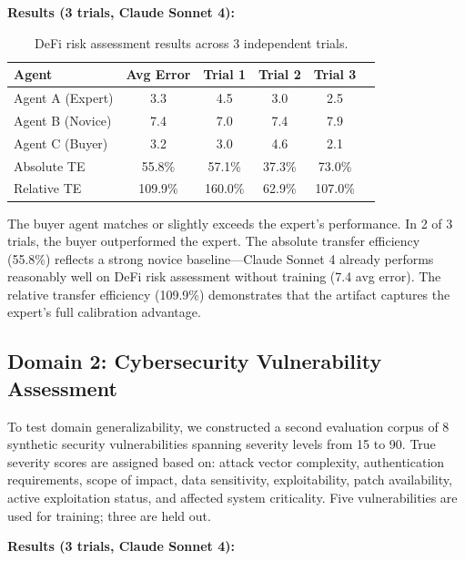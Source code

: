 \documentclass[11pt]{article}
\begin{document}
\textbf{Results (3 trials, Claude Sonnet 4):}

\begin{table}[h]
\centering
\caption{DeFi risk assessment results across 3 independent trials.}
\label{tab:defi_results}
\begin{tabular}{lccccc}
\toprule
\textbf{Agent} & \textbf{Avg Error} & \textbf{Trial 1} & \textbf{Trial 2} & \textbf{Trial 3} \\
\midrule
Agent A (Expert) & 3.3 & 4.5 & 3.0 & 2.5 \\
Agent B (Novice) & 7.4 & 7.0 & 7.4 & 7.9 \\
Agent C (Buyer)  & 3.2 & 3.0 & 4.6 & 2.1 \\
\midrule
Absolute TE      & 55.8\% & 57.1\% & 37.3\% & 73.0\% \\
Relative TE      & 109.9\% & 160.0\% & 62.9\% & 107.0\% \\
\bottomrule
\end{tabular}
\end{table}

The buyer agent matches or slightly exceeds the expert's performance. In 2 of 3 trials, the buyer outperformed the expert. The absolute transfer efficiency (55.8\%) reflects a strong novice baseline---Claude Sonnet 4 already performs reasonably well on DeFi risk assessment without training (7.4 avg error). The relative transfer efficiency (109.9\%) demonstrates that the artifact captures the expert's full calibration advantage.

\subsection{Domain 2: Cybersecurity Vulnerability Assessment}

To test domain generalizability, we constructed a second evaluation corpus of 8 synthetic security vulnerabilities spanning severity levels from 15 to 90. True severity scores are assigned based on: attack vector complexity, authentication requirements, scope of impact, data sensitivity, exploitability, patch availability, active exploitation status, and affected system criticality. Five vulnerabilities are used for training; three are held out.

\textbf{Results (3 trials, Claude Sonnet 4):}
\end{document}
